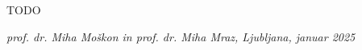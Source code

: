 %
%

TODO


\begin{flushright}
\textit{prof. dr. Miha Moškon in prof. dr. Miha Mraz, Ljubljana, januar 2025}
\end{flushright}

